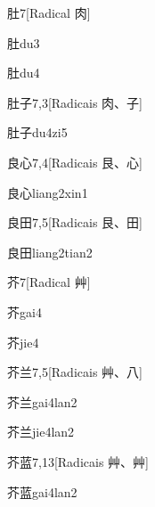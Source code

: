 \begin{entry}{肚}{7}[Radical ⾁]
  \begin{phonetics}{肚}{du3}
  \end{phonetics}
  \begin{phonetics}{肚}{du4}
  \end{phonetics}
\end{entry}

\begin{entry}{肚子}{7,3}[Radicais ⾁、⼦]
  \begin{phonetics}{肚子}{du4zi5}
  \end{phonetics}
\end{entry}

\begin{entry}{良心}{7,4}[Radicais ⾉、⼼]
  \begin{phonetics}{良心}{liang2xin1}
  \end{phonetics}
\end{entry}

\begin{entry}{良田}{7,5}[Radicais ⾉、⽥]
  \begin{phonetics}{良田}{liang2tian2}
  \end{phonetics}
\end{entry}

\begin{entry}{芥}{7}[Radical ⾋]
  \begin{phonetics}{芥}{gai4}
  \end{phonetics}
  \begin{phonetics}{芥}{jie4}
  \end{phonetics}
\end{entry}

\begin{entry}{芥兰}{7,5}[Radicais ⾋、⼋]
  \begin{phonetics}{芥兰}{gai4lan2}
  \end{phonetics}
  \begin{phonetics}{芥兰}{jie4lan2}
  \end{phonetics}
\end{entry}

\begin{entry}{芥蓝}{7,13}[Radicais ⾋、⾋]
  \begin{phonetics}{芥蓝}{gai4lan2}
  \end{phonetics}
\end{entry}

